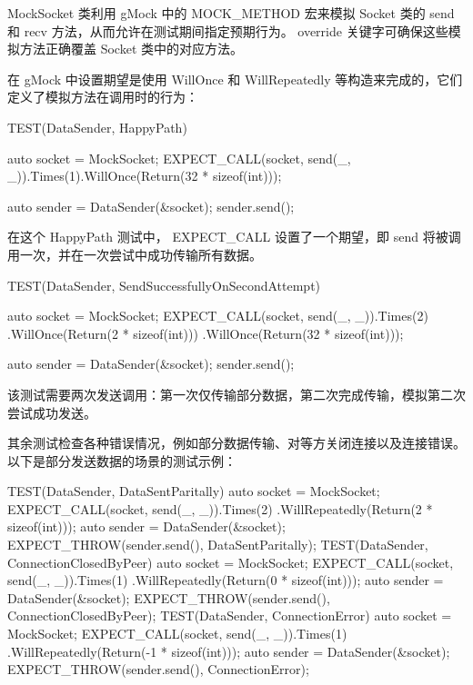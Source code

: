 MockSocket 类利用 gMock 中的 MOCK\_METHOD 宏来模拟 Socket 类的 send 和 recv 方法，从而允许在测试期间指定预期行为。 override 关键字可确保这些模拟方法正确覆盖 Socket 类中的对应方法。

在 gMock 中设置期望是使用 WillOnce 和 WillRepeatedly 等构造来完成的，它们定义了模拟方法在调用时的行为：

\begin{cpp}
TEST(DataSender, HappyPath) {
    auto socket = MockSocket{};
    EXPECT_CALL(socket, send(_, _)).Times(1).WillOnce(Return(32 * sizeof(int)));

    auto sender = DataSender(&socket);
    sender.send();
}
\end{cpp}

在这个 HappyPath 测试中， EXPECT\_CALL 设置了一个期望，即 send 将被调用一次，并在一次尝试中成功传输所有数据。

\begin{cpp}
TEST(DataSender, SendSuccessfullyOnSecondAttempt) {
    auto socket = MockSocket{};
    EXPECT_CALL(socket, send(_, _)).Times(2)
                                   .WillOnce(Return(2 * sizeof(int)))
                                   .WillOnce(Return(32 * sizeof(int)));

    auto sender = DataSender(&socket);
    sender.send();
}
\end{cpp}

该测试需要两次发送调用：第一次仅传输部分数据，第二次完成传输，模拟第二次尝试成功发送。

其余测试检查各种错误情况，例如部分数据传输、对等方关闭连接以及连接错误。以下是部分发送数据的场景的测试示例：

\begin{cpp}
TEST(DataSender, DataSentParitally) {
    auto socket = MockSocket{};
    EXPECT_CALL(socket, send(_, _)).Times(2)
                                   .WillRepeatedly(Return(2 * sizeof(int)));
    auto sender = DataSender(&socket);
    EXPECT_THROW(sender.send(), DataSentParitally);
}
TEST(DataSender, ConnectionClosedByPeer) {
    auto socket = MockSocket{};
    EXPECT_CALL(socket, send(_, _)).Times(1)
                                   .WillRepeatedly(Return(0 * sizeof(int)));
    auto sender = DataSender(&socket);
    EXPECT_THROW(sender.send(), ConnectionClosedByPeer);
}
TEST(DataSender, ConnectionError) {
    auto socket = MockSocket{};
    EXPECT_CALL(socket, send(_, _)).Times(1)
                                   .WillRepeatedly(Return(-1 * sizeof(int)));
    auto sender = DataSender(&socket);
    EXPECT_THROW(sender.send(), ConnectionError);
}
\end{cpp}

